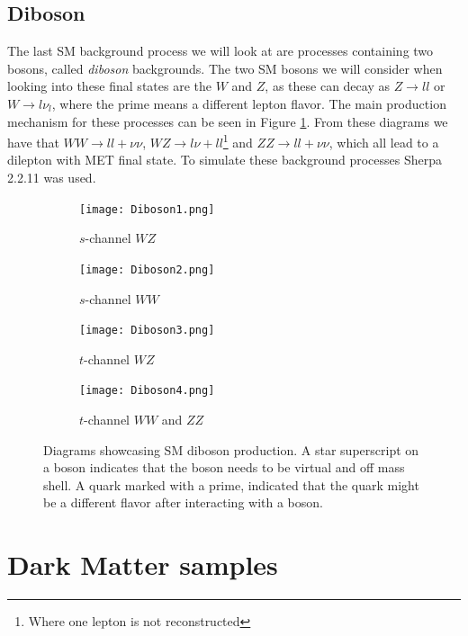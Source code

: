 \documentclass[12pt, a4paper]{book}
\begin{document}
\subsection{Diboson}
The last SM background process we will look at are processes containing two bosons, called \textit{diboson} backgrounds. The two SM bosons we will consider when looking into these final states are the $W$ and $Z$, as these can decay as $Z\rightarrow ll$ 
or $W\rightarrow l\nu_l$, where the prime means a different lepton flavor. The main production mechanism for these processes can be seen in Figure \ref{fig:Diboson_BKG}. From these diagrams we have that $WW\rightarrow ll+\nu\nu$, $WZ\rightarrow l\nu+ll$\footnote{Where one lepton is not reconstructed} and $ZZ\rightarrow ll+\nu\nu$, 
which all lead to a dilepton with MET final state. To simulate these background processes Sherpa 2.2.11 \cite{Sherpa} was used.
\begin{figure}[!ht]
    \centering 
    \begin{subfigure}[b]{0.4\textwidth}
        \centering
        \texttt{[image: Diboson1.png]}
        \caption{$s$-channel $WZ$}
    \end{subfigure}
    \hfill
    \begin{subfigure}[b]{0.4\textwidth}
        \centering
        \texttt{[image: Diboson2.png]}
        \caption{$s$-channel $WW$}
    \end{subfigure}
    \hfill
    \begin{subfigure}[b]{0.4\textwidth}
        \centering
        \texttt{[image: Diboson3.png]}
        \caption{$t$-channel $WZ$}
    \end{subfigure}
    \hfill
    \begin{subfigure}[b]{0.4\textwidth}
        \centering
        \texttt{[image: Diboson4.png]}
        \caption{$t$-channel $WW$ and $ZZ$}
    \end{subfigure}
    \caption[Diboson production]{Diagrams showcasing SM diboson production. A star superscript on a boson indicates that the boson needs to be virtual and off mass shell.  A quark marked with a prime, indicated that the quark might be a different flavor after interacting with a boson. }\label{fig:Diboson_BKG}
\end{figure}

\newpage
\section{Dark Matter samples}\label{chap:DM_sample}
\end{document}
